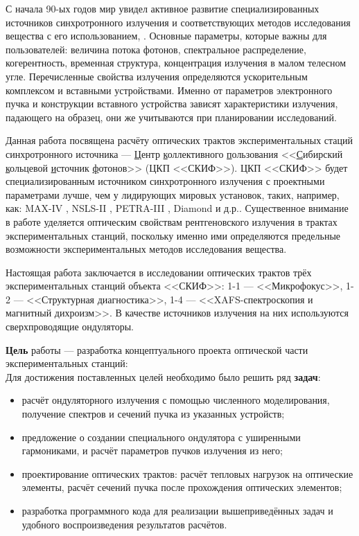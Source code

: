 {\actuality}
С начала 90-ых годов мир увидел активное развитие специализированных источников синхротронного излучения и соответствующих методов исследования вещества с его использованием, \cite{willmott2019introduction}. Основные параметры, которые важны для пользователей: величина потока фотонов, спектральное распределение, когерентность, временная структура, концентрация излучения в малом телесном угле. Перечисленные свойства излучения определяются ускорительным комплексом и вставными устройствами. Именно от параметров электронного пучка и конструкции вставного устройства зависят характеристики излучения, падающего на образец, они же учитываются при планировании исследований.

Данная работа посвящена расчёту оптических трактов экспериментальных стаций синхротронного источника --- \underline{Ц}ентр \underline{к}оллективного \underline{п}ользования <<\underline{С}ибирский \underline{к}ольцевой \underline{и}сточник \underline{ф}отонов>> (ЦКП <<СКИФ>>). 
ЦКП <<СКИФ>> будет специализированным источником синхротронного излучения с проектными параметрами лучше, чем у лидирующих мировых установок\cite{zorin2019radiation}, таких, например, как: MAX-IV \cite{max2010max}, NSLS-II \cite{NSLS}, PETRA-III \cite{balewski2004petra}, Diamond \cite{DIAMOND} и д.р.. Существенное внимание в работе уделяется оптическим свойствам рентгеновского излучения в трактах экспериментальных станций, поскольку именно ими определяются предельные возможности экспериментальных методов исследования вещества. 

Настоящая работа заключается в исследовании оптических трактов трёх экспериментальных станций объекта <<СКИФ>>: 1-1 --- <<Микрофокус>>, 1-2 --- <<Структурная диагностика>>, 1-4 --- <<XAFS-спектроскопия и магнитный дихроизм>>. В качестве источников излучения на них используются сверхпроводящие ондуляторы. 

\textbf{Цель} работы --- разработка концептуального проекта оптической части экспериментальных станций:\\
Для достижения поставленных целей необходимо было решить ряд \textbf{задач}:
\begin{itemize}
	\item расчёт ондуляторного излучения с помощью численного моделирования, получение спектров и сечений пучка из указанных устройств;
	\item предложение о создании специального ондулятора с уширенными гармониками, и расчёт параметров пучков излучения из него;
	\item проектирование оптических трактов: расчёт тепловых нагрузок на оптические элементы, расчёт сечений пучка после прохождения оптических элементов;
	\item разработка программного кода для реализации вышеприведённых задач и удобного воспроизведения результатов расчётов.
\end{itemize}

